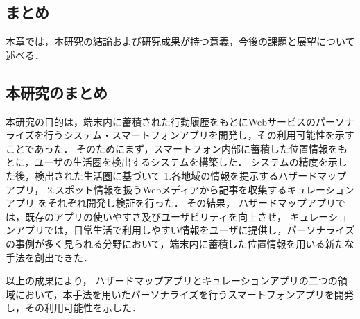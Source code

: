 \documentclass[a4paper]{jsarticle}
\begin{document}
\begin{enumerate}
\begin{enumerate}
\section{まとめ}
本章では，本研究の結論および研究成果が持つ意義，今後の課題と展望について述べる．

\subsection{本研究のまとめ}
本研究の目的は，端末内に蓄積された行動履歴をもとにWebサービスのパーソナライズを行うシステム・スマートフォンアプリを開発し，その利用可能性を示すことであった．
そのためにまず，スマートフォン内部に蓄積した位置情報をもとに，ユーザの生活圏を検出するシステムを構築した．
システムの精度を示した後，検出された生活圏に基づいて
1.各地域の情報を提示するハザードマップアプリ，
2.スポット情報を扱うWebメディアから記事を収集するキュレーションアプリ
をそれぞれ開発し検証を行った．
その結果，
ハザードマップアプリでは，既存のアプリの使いやすさ及びユーザビリティを向上させ，
キュレーションアプリでは，日常生活で利用しやすい情報をユーザに提供し，パーソナライズの事例が多く見られる分野において，端末内に蓄積した位置情報を用いる新たな手法を創出できた．
%
%
%
%
%

以上の成果により，
ハザードマップアプリとキュレーションアプリの二つの領域において，本手法を用いたパーソナライズを行うスマートフォンアプリを開発し，その利用可能性を示した．


\end{enumerate}
\end{enumerate}
\end{document}
